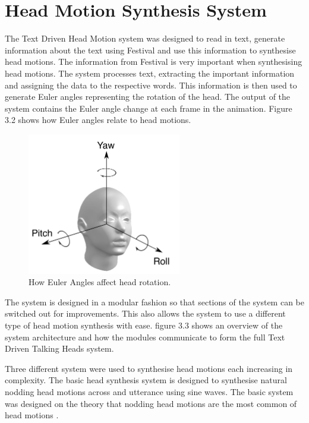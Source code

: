 \documentclass[bsc,frontabs,twoside,singlespacing,parskip,deptreport]{infthesis}
\begin{document}
\section{Head Motion Synthesis System}

The Text Driven Head Motion system was designed to read in text, generate information about the text using Festival and use this information to synthesise head motions. The information from Festival is very important when synthesising head motions. The system processes text, extracting the important information and assigning the data to the respective words. This information is then used to generate Euler angles representing the rotation of the head. The output of the system contains the Euler angle change at each frame in the animation. Figure 3.2 shows how Euler angles relate to head motions.

\begin{figure}
	\centering
	\includegraphics[width=0.6\textwidth]{head_with_euler.png}
	\caption{How Euler Angles affect head rotation.}
\end{figure}

The system is designed in a modular fashion so that sections of the system can be switched out for improvements. This also allows the system to use a different type of head motion synthesis with ease. figure 3.3 shows an overview of the system architecture and how the modules communicate to form the full Text Driven Talking Heads system. 

Three different system were used to synthesise head motions each increasing in complexity. The basic head synthesis system is designed to synthesise natural nodding head motions across and utterance using sine waves. The basic system was designed on the theory that nodding head motions are the most common of head motions \cite{first_paper}.
\end{document}
